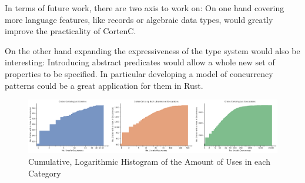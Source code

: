 \documentclass[twoside, english]{sdqthesis}
\theoremstyle{definition}
\begin{document}
In terms of future work, there are two axis to work on: 
On one hand covering more language features, like records or algebraic data types, would greatly improve the practicality of CortenC. 

On the other hand expanding the expressiveness of the type system would also be interesting: Introducing abstract predicates would allow a whole new set of properties to be specified. In particular developing a model of concurrency patterns could be a great application for them in Rust.

\fi



\printbibliography[heading=bibintoc]

\appendix


\begin{figure}[h]
	\centering
	\includegraphics[width=0.99\linewidth, clip, trim={0.2cm 0.2cm 0.2cm 0.2cm}]{../unsafe-occurences-vs-no-crates.pdf}
	\caption{Cumulative, Logarithmic Histogram of the Amount of  Uses in each Category}
	\label{fig:unsafe-hist}
\end{figure}
\end{document}
